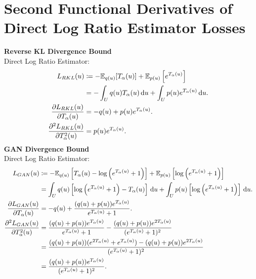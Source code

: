 \documentclass[honours,12pt, twoside]{unswthesis}
\newcommand{\E}{\mathbb{E}}
\numberwithin{equation}{section}
\theoremstyle{definition}
\begin{document}
\chapter{Second Functional Derivatives of Direct Log Ratio Estimator Losses}\label{app:F}
\textbf{Reverse KL Divergence Bound}\\
Direct Log Ratio Estimator:
\begin{align*}
L_{RKL}(u)&\coloneqq-\E_{q(u)}[T_\alpha(u)]+\E_{p(u)}\left[e^{T_\alpha(u)}\right]\\
&=-\int_U q(u)T_\alpha(u)\, {\rm d}u+\int_U p(u)e^{T_\alpha(u)}\, {\rm d}u.\\
\frac{\partial L_{RKL}(u)}{\partial T_\alpha(u)}&=-q(u)+p(u)e^{T_\alpha(u)}.\\
\frac{\partial^2L_{RKL}(u)}{\partial T_\alpha^2(u)}&=p(u)e^{T_\alpha(u)}.
\end{align*}
\textbf{GAN Divergence Bound}\\
Direct Log Ratio Estimator:
\begin{align*}
L_{GAN}(u)&\coloneqq-\E_{q(u)}\left[T_\alpha(u)-\log\left(e^{T_\alpha(u)}+1\right)\right]+\E_{p(u)}\left[\log\left(e^{T_\alpha(u)}+1\right)\right]\\
&=\int_U q(u)\left[\log\left(e^{T_\alpha(u)}+1\right)-T_\alpha(u)\right] \, {\rm d}u+\int_U p(u)\left[\log\left(e^{T_\alpha(u)}+1\right)\right]\, {\rm d}u.\\
\frac{\partial L_{GAN}(u)}{\partial T_\alpha(u)}&=-q(u)+\frac{(q(u)+p(u))e^{T_\alpha(u)}}{e^{T_\alpha(u)}+1}.\\
\frac{\partial^2L_{GAN}(u)}{\partial T_\alpha^2(u)}&=\frac{(q(u)+p(u))e^{T_\alpha(u)}}{e^{T_\alpha(u)}+1}-\frac{(q(u)+p(u))e^{2T_\alpha(u)}}{(e^{T_\alpha(u)}+1)^2}\\
&=\frac{(q(u)+p(u))(e^{2T_\alpha(u)}+e^{T_\alpha(u)})-(q(u)+p(u))e^{2T_\alpha(u)}}{(e^{T_\alpha(u)}+1)^2}\\
&=\frac{(q(u)+p(u))e^{T_\alpha(u)}}{(e^{T_\alpha(u)}+1)^2}.
\end{align*}
\end{document}
